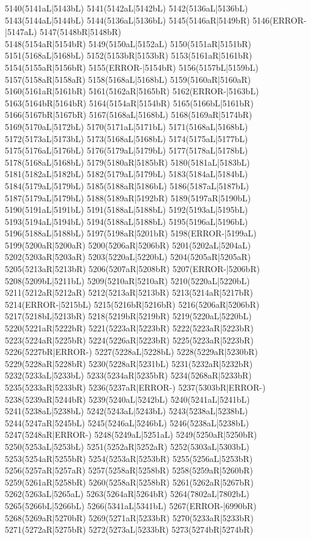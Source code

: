 5140(5141aL|5143bL) 5141(5142aL|5142bL) 5142(5136aL|5136bL) 5143(5144aL|5144bL) 5144(5136aL|5136bL) 5145(5146aR|5149bR) 5146(ERROR-|5147aL) 5147(5148bR|5148bR) \\5148(5154aR|5154bR) 5149(5150aL|5152aL) 5150(5151aR|5151bR) 5151(5168aL|5168bL) 5152(5153bR|5153bR) 5153(5161aR|5161bR) 5154(5155aR|5156bR) 5155(ERROR-|5154bR) 5156(5157bL|5159bL) \\5157(5158aR|5158aR) 5158(5168aL|5168bL) 5159(5160aR|5160aR) 5160(5161aR|5161bR) 5161(5162aR|5165bR) 5162(ERROR-|5163bL) 5163(5164bR|5164bR) 5164(5154aR|5154bR) 5165(5166bL|5161bR) \\5166(5167bR|5167bR) 5167(5168aL|5168bL) 5168(5169aR|5174bR) 5169(5170aL|5172bL) 5170(5171aL|5171bL) 5171(5168aL|5168bL) 5172(5173aL|5173bL) 5173(5168aL|5168bL) 5174(5175aL|5177bL) \\5175(5176aL|5176bL) 5176(5179aL|5179bL) 5177(5178aL|5178bL) 5178(5168aL|5168bL) 5179(5180aR|5185bR) 5180(5181aL|5183bL) 5181(5182aL|5182bL) 5182(5179aL|5179bL) 5183(5184aL|5184bL) \\5184(5179aL|5179bL) 5185(5188aR|5186bL) 5186(5187aL|5187bL) 5187(5179aL|5179bL) 5188(5189aR|5192bR) 5189(5197aR|5190bL) 5190(5191aL|5191bL) 5191(5188aL|5188bL) 5192(5193aL|5195bL) \\5193(5194aL|5194bL) 5194(5188aL|5188bL) 5195(5196aL|5196bL) 5196(5188aL|5188bL) 5197(5198aR|5201bR) 5198(ERROR-|5199aL) 5199(5200aR|5200aR) 5200(5206aR|5206bR) 5201(5202aL|5204aL) \\5202(5203aR|5203aR) 5203(5220aL|5220bL) 5204(5205aR|5205aR) 5205(5213aR|5213bR) 5206(5207aR|5208bR) 5207(ERROR-|5206bR) 5208(5209bL|5211bL) 5209(5210aR|5210aR) 5210(5220aL|5220bL) \\5211(5212aR|5212aR) 5212(5213aR|5213bR) 5213(5214aR|5217bR) 5214(ERROR-|5215bL) 5215(5216bR|5216bR) 5216(5206aR|5206bR) 5217(5218bL|5213bR) 5218(5219bR|5219bR) 5219(5220aL|5220bL) \\5220(5221aR|5222bR) 5221(5223aR|5223bR) 5222(5223aR|5223bR) 5223(5224aR|5225bR) 5224(5226aR|5223bR) 5225(5223aR|5223bR) 5226(5227bR|ERROR-) 5227(5228aL|5228bL) 5228(5229aR|5230bR) \\5229(5228aR|5228bR) 5230(5228aR|5231bL) 5231(5232aR|5232bR) 5232(5233aL|5233bL) 5233(5234aR|5235bR) 5234(5268aR|5233bR) 5235(5233aR|5233bR) 5236(5237aR|ERROR-) 5237(5303bR|ERROR-) \\5238(5239aR|5244bR) 5239(5240aL|5242bL) 5240(5241aL|5241bL) 5241(5238aL|5238bL) 5242(5243aL|5243bL) 5243(5238aL|5238bL) 5244(5247aR|5245bL) 5245(5246aL|5246bL) 5246(5238aL|5238bL) \\5247(5248aR|ERROR-) 5248(5249aL|5251aL) 5249(5250aR|5250bR) 5250(5253aL|5253bL) 5251(5252aR|5252aR) 5252(5303aL|5303bL) 5253(5254aR|5255bR) 5254(5253aR|5253bR) 5255(5256aL|5253bR) \\5256(5257aR|5257aR) 5257(5258aR|5258bR) 5258(5259aR|5260bR) 5259(5261aR|5258bR) 5260(5258aR|5258bR) 5261(5262aR|5267bR) 5262(5263aL|5265aL) 5263(5264aR|5264bR) 5264(7802aL|7802bL) \\5265(5266bL|5266bL) 5266(5341aL|5341bL) 5267(ERROR-|6990bR) 5268(5269aR|5270bR) 5269(5271aR|5233bR) 5270(5233aR|5233bR) 5271(5272aR|5275bR) 5272(5273aL|5233bR) 5273(5274bR|5274bR) 
